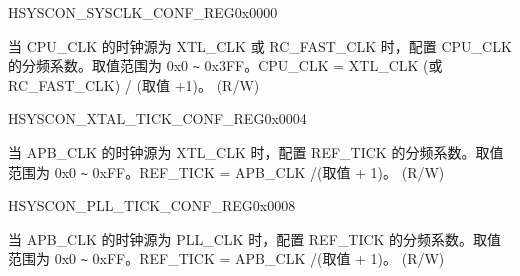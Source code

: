 \begin{register}{H}{SYSCON\_SYSCLK\_CONF\_REG}{0x0000}\label{regdesc:SYSCONSYSCLKCONFREG}
    \regnewline%
    \begin{regdesc}\begin{reglist}
    \label{fielddesc:SYSCONPREDIVCNT}\item [SYSCON\_PRE\_DIV\_CNT] 当 CPU\_CLK 的时钟源为 XTL\_CLK 或 RC\_FAST\_CLK 时，配置 CPU\_CLK 的分频系数。取值范围为 0x0 \verb+~+ 0x3FF。CPU\_CLK =  XTL\_CLK (或 RC\_FAST\_CLK) / (取值 +1)。 (R/W)
    \end{reglist}\end{regdesc}
    \end{register}


    \begin{register}{H}{SYSCON\_XTAL\_TICK\_CONF\_REG}{0x0004}\label{regdesc:SYSCONXTALTICKCONFREG}
    \regnewline%
    \begin{regdesc}\begin{reglist}
    \label{fielddesc:SYSCONXTALTICKNUM}\item [SYSCON\_XTAL\_TICK\_NUM] 当 APB\_CLK 的时钟源为 XTL\_CLK 时，配置 REF\_TICK 的分频系数。取值范围为 0x0 \verb+~+ 0xFF。REF\_TICK = APB\_CLK /(取值 + 1)。 (R/W)
    \end{reglist}\end{regdesc}
    \end{register}


    \begin{register}{H}{SYSCON\_PLL\_TICK\_CONF\_REG}{0x0008}\label{regdesc:SYSCONPLLTICKCONFREG}
    \regnewline%
    \begin{regdesc}\begin{reglist}
    \label{fielddesc:SYSCONPLLTICKNUM}\item [SYSCON\_PLL\_TICK\_NUM] 当 APB\_CLK 的时钟源为 PLL\_CLK 时，配置 REF\_TICK 的分频系数。取值范围为 0x0 \verb+~+ 0xFF。REF\_TICK = APB\_CLK /(取值 + 1)。 (R/W)
    \end{reglist}\end{regdesc}
    \end{register}


